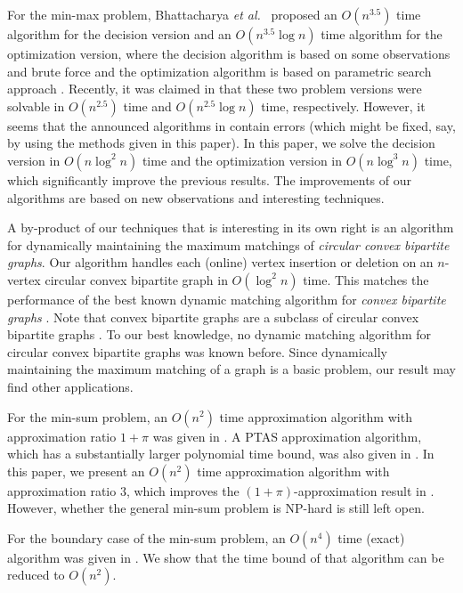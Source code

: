 \documentclass[11pt]{article}
\begin{document}
For the min-max problem, Bhattacharya {\em et al.}~\cite{ref:BhattacharyaOp09}
proposed an $O(n^{3.5})$ time algorithm
for the decision version and an $O(n^{3.5} \log n)$ time algorithm
for the optimization version, where the decision algorithm is
based on some observations and brute force and the optimization
algorithm is based on parametric search approach
\cite{ref:ColeSl87,ref:MegiddoAp83}.
Recently, it was claimed in \cite{ref:TanNe10} that these two
problem versions were solvable in $O(n^{2.5})$ time and
$O(n^{2.5}\log n)$ time, respectively. However, it seems that the
announced algorithms in \cite{ref:TanNe10} contain errors (which
might be fixed, say, by using the methods given in this paper).
In this paper, we solve the decision version in $O(n\log^2 n)$ time and the
optimization version in $O(n\log^3n)$ time, which significantly
improve the previous results. The improvements of our algorithms are
based on new observations and interesting techniques.


A by-product of our techniques that is interesting in its own right
is an algorithm for dynamically maintaining the maximum matchings of
{\em circular convex bipartite graphs}. Our
algorithm handles each (online) vertex insertion or deletion on
an $n$-vertex circular convex bipartite graph in $O(\log^2 n)$ time.
This matches the performance of the best known
dynamic matching algorithm for {\em convex bipartite graphs}
\cite{ref:BrodalDy07}. Note that convex bipartite graphs are a subclass of
circular convex bipartite graphs \cite{ref:LiangCi95}.  To our best knowledge,
no dynamic matching algorithm for circular convex bipartite graphs was known before.
Since dynamically maintaining the maximum
matching of a graph is a basic problem, our result
may find other applications.



For the min-sum problem, an $O(n^2)$ time approximation algorithm with approximation
ratio $1+\pi$ was given in \cite{ref:BhattacharyaOp09}. A PTAS approximation
algorithm, which has a substantially larger polynomial time bound,
was also given in \cite{ref:BhattacharyaOp09}. In this paper,
we present an $O(n^2)$ time approximation algorithm with approximation
ratio $3$, which improves the $(1+\pi)$-approximation result in
\cite{ref:BhattacharyaOp09}. However, whether the general min-sum problem is
NP-hard is still left open.

For the boundary case of the min-sum problem, an $O(n^4)$ time
(exact) algorithm was given in \cite{ref:TanNe10}. We show that the
time bound of that algorithm can be reduced to $O(n^2)$.
\end{document}

